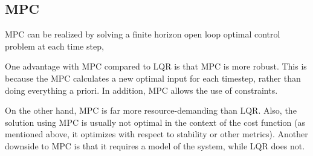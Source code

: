\subsection{MPC}
MPC can be realized by solving a finite horizon open loop optimal control problem at each time step, 

One advantage with MPC compared to LQR is that MPC is more robust. This is because the MPC calculates a new optimal input for each timestep, rather than doing everything a priori. In addition, MPC allows the use of constraints.

On the other hand, MPC is far more resource-demanding than LQR. Also, the solution using MPC is usually not optimal in the context of the cost function (as mentioned above, it optimizes with respect to stability or other metrics). Another downside to MPC is that it requires a model of the system, while LQR does not.
